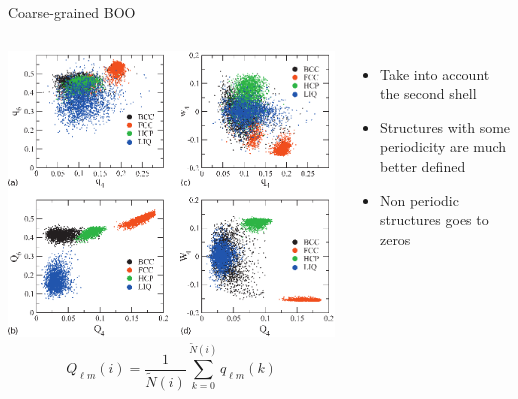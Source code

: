 \begin{frame}{Coarse-grained BOO}
	\begin{columns}
	\includegraphics[width=\columnwidth]{invariants_maps_raster}
	\[ Q_{\ell m}(i) = \frac{1}{\tilde{N} (i)} \sum_{k=0}^{\tilde{N}(i)} q_{\ell m}(k) \]
	\begin{itemize}
		\item Take into account the second shell
		\item Structures with some periodicity are much better defined
		\item Non periodic structures goes to zeros
	\end{itemize}
	\end{columns}
	\footnotesize{\citet{lechner2008}}
\end{frame}

